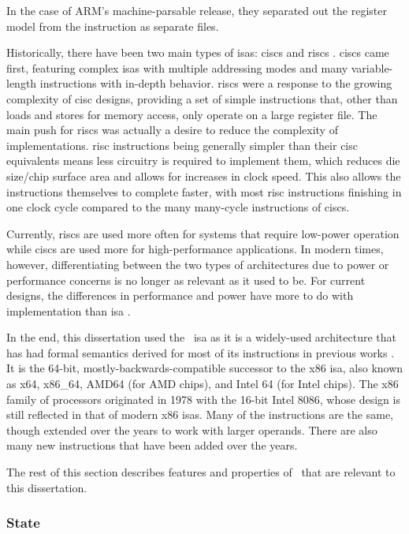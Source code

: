 In the case of ARM's machine-parsable release, they separated out the register model
from the instruction as separate files.


Historically, there have been two main types of \acp{isa}:
\acp{cisc} and \acp{risc} \autocite{jamil1995rc}.
\Acp{cisc} came first, featuring complex \acp{isa} with multiple addressing modes
and many variable-length instructions with in-depth behavior.
\Acp{risc} were a response to the growing complexity of \ac{cisc} designs,
providing a set of simple instructions that,
other than loads and stores for memory access, only operate on a large register file.
The main push for \acp{risc} was actually a desire
to reduce the complexity of implementations. \Ac{risc} instructions being
generally simpler than their \ac{cisc} equivalents
means less circuitry is required to implement them,
which reduces die size/chip surface area and allows for increases in clock speed.
This also allows the instructions themselves to complete faster,
with most \ac{risc} instructions finishing in one clock cycle
compared to the many many-cycle instructions of \acp{cisc}.

Currently, \acp{risc} are used more often for systems that require
low-power operation while \acp{cisc} are used more for high-performance applications.
In modern times, however, differentiating between the two types of architectures
due to power or performance concerns is no longer as relevant as it used to be.
For current designs, the differences in performance and power
have more to do with implementation than \ac{isa} \autocite{blem2013struggles}.

In the end,
this dissertation used the \arch\ \ac{isa} as it is a widely-used architecture
that has had formal semantics derived for most of its instructions
in previous works \autocite{heule2016stratified,roessle2019}.
It is the 64-bit, mostly-backwards-compatible successor to the x86 \ac{isa},
also known as x64, x86\_64, AMD64 (for AMD chips), and Intel 64 (for Intel chips).
The x86 family of processors originated in 1978 with the 16-bit Intel 8086,
whose design is still reflected in that of modern x86 \acp{isa}.
Many of the instructions are the same,
though extended over the years to work with larger operands.
There are also many new instructions that have been added over the years.

The rest of this section describes features and properties of \arch\ that are relevant
to this dissertation.

\subsubsection{State}

